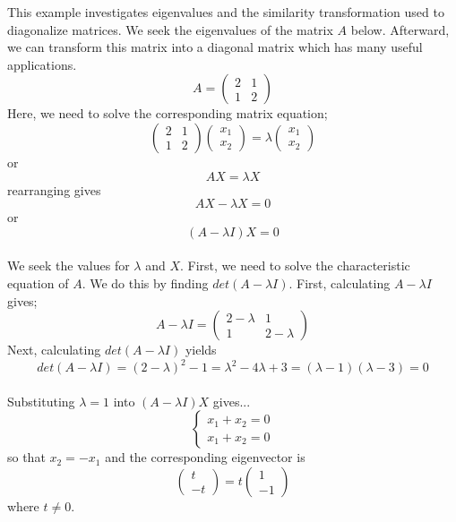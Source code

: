\documentclass[12pt]{article}
\begin{document}
This example investigates eigenvalues and the similarity transformation used
to diagonalize matrices.  We seek the eigenvalues of the matrix $A$ below.  Afterward,
we can transform this matrix into a diagonal matrix which has many useful applications.\\
$$A=\left( \begin{array}{cc}
2 & 1 \\
1 & 2
\end{array} \right )$$
Here, we need to solve the corresponding matrix equation;\\
$$\left( \begin{array}{cc}
2 & 1 \\
1 & 2
\end{array} \right )
\left( \begin{array}{c}
x_1 \\
x_2
\end{array} \right )=\lambda
\left( \begin{array}{c}
x_1 \\
x_2
\end{array} \right )$$ or\\
$$AX=\lambda X$$ 
rearranging gives
$$AX-\lambda X=0$$ or\\
$$(A-\lambda I) X=0$$\\
We seek the values for $\lambda$ and $X$.
First, we need to solve the characteristic equation of $A$.  We do this by finding
$det(A-\lambda I)$.  First, calculating $A-\lambda I$ gives;\\
$$A -\lambda I=
\left( \begin{array}{cc}
2-\lambda & 1 \\
1 & 2-\lambda
\end{array} \right )$$
Next, calculating $det(A-\lambda I)$ yields\\
$$det(A-\lambda I)=(2-\lambda)^2-1=\lambda^2-4\lambda+3=(\lambda-1)(\lambda-3)=0$$\\
Substituting $\lambda=1$ into $(A-\lambda I)X$ gives...\\
$$\left\{ \begin{array}{c}
x_1+x_2=0 \\
x_1+x_2=0
\end{array} \right.$$
so that $x_2=-x_1$ and the corresponding eigenvector is
$$\left( \begin{array}{c}
t \\
-t
\end{array} \right )=t
\left( \begin{array}{c}
1 \\
-1
\end{array} \right )$$  where $t\ne 0.$\\
\end{document}
